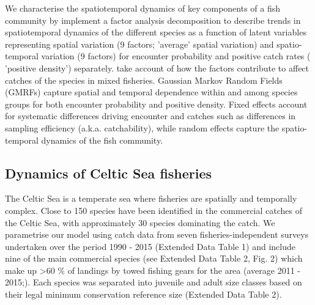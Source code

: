 \documentclass{nature}
\begin{document}
\begin{linenumbers}
 We 
characterise the spatiotemporal dynamics of key components of a fish community
by implement a factor analysis decomposition
to describe trends in spatiotemporal dynamics of the different species as a
function of latent variables\cite{Thorson2015} representing spatial variation
(9 factors;  'average' spatial variation) and
spatio-temporal variation (9 factors) for encounter probability and positive
catch rates ( 'positive density')
separately\cite{Thorson2015a}.   take account of how the factors contribute to affect
catches of the species in mixed fisheries. Gaussian Markov
Random Fields (GMRFs) capture spatial and temporal dependence
within and among species groups for both encounter probability and positive
density\cite{Thorson2013}. Fixed effects account for
systematic differences driving encounter and catches\deleted{,} such as
differences in sampling efficiency (a.k.a.  catchability), while random effects
capture the spatio-temporal dynamics of the fish community.

\subsection{Dynamics of Celtic Sea fisheries} The Celtic Sea
is a temperate sea where fisheries are spatially and temporally
complex\cite{Ellis2000, Gerritsen2012}. Close to 150
species have been identified in the commercial catches of the Celtic Sea, with
approximately 30 species dominating the catch\cite{Mateo2016}. We parametrise
our  model using catch data from seven
fisheries-independent surveys undertaken over the
period 1990 - 2015 (Extended Data Table 1) and include nine of the main
commercial species (see Extended Data Table 2, Fig. 2)  which make up \textgreater 60 \% of landings by towed fishing
gears for the area (average 2011 - 2015;\cite{STECF2017}). Each species was
separated into juvenile and adult size classes based on their legal minimum
conservation reference size (Extended Data Table 2).


\end{linenumbers}
\end{document}
